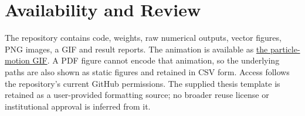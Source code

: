 \section{Availability and Review}
The repository contains code, weights, raw numerical outputs, vector figures,
PNG images, a GIF and result reports. The animation is available as
\href{https://github.com/mohrezsayeh90-ai/basic_particle_problem/blob/main/results/final_study/figures/17_particle_motion.gif}{the particle-motion GIF}.
A PDF figure cannot encode that animation, so the underlying paths are also
shown as static figures and retained in CSV form. Access follows the
repository's current GitHub permissions. The supplied thesis template is
retained as a user-provided formatting source; no broader reuse license or
institutional approval is inferred from it.
